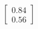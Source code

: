 \documentclass[preview]{standalone}
\begin{document}
\begin{align*}
\begin{bmatrix} 0.84 \\ 0.56 \end{bmatrix}
\end{align*}
\end{document}
